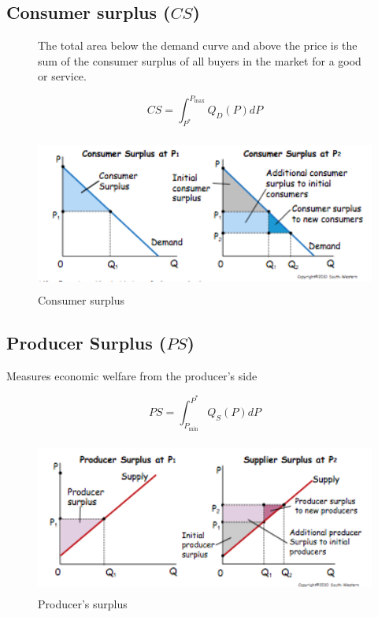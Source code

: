 \documentclass[a4paper,titlepage] {scrartcl}
\begin{document}
\subsection{Consumer surplus ($CS$)}
\begin{figure}[htbp]
	The total area below the demand curve and above the price is the 
	sum of the consumer surplus of all buyers in the market for a good or 
	service. 
	
	\begin{equation}
		CS=\int_{P^*}^{P_{\text{max}}}Q_D(P)dP
	\end{equation}

	\centering
		\includegraphics[height=2in]{images/consumer surplus.png}
	\caption{Consumer surplus}
	\label{fig:images_consumer surplus}
\end{figure}

\subsection{Producer Surplus ($PS$)}
Measures economic welfare from the producer's side

\begin{equation}
	PS=\int_{P_{\text{min}}}^{P^*}Q_S(P)dP
\end{equation}

\begin{figure}[htbp]
	\centering
		\includegraphics[height=2in]{images/prodSurplus.png}
	\caption{Producer's surplus}
	\label{fig:images_prodSurplus}
\end{figure}
\end{document}
